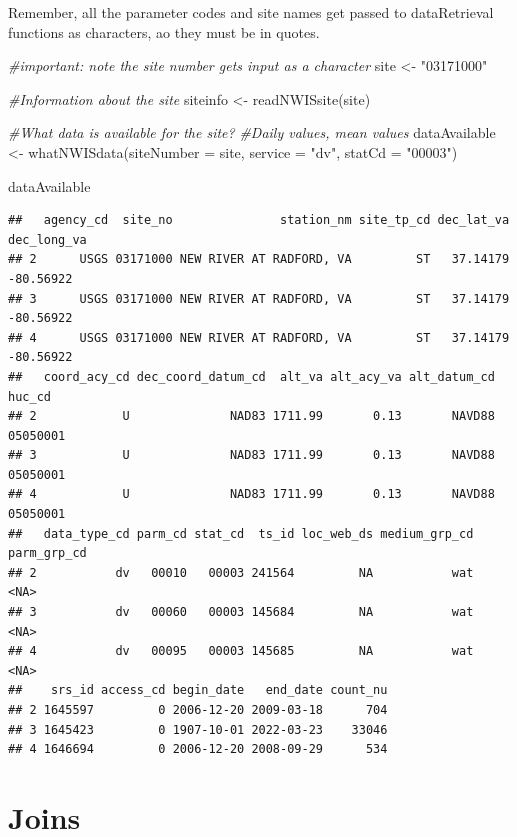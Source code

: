 \documentclass[
]{book}
\newenvironment{Shaded}{\begin{snugshade}}{\end{snugshade}}
\newcommand{\AttributeTok}[1]{\textcolor[rgb]{0.77,0.63,0.00}{#1}}
\newcommand{\CommentTok}[1]{\textcolor[rgb]{0.56,0.35,0.01}{\textit{#1}}}
\newcommand{\FunctionTok}[1]{\textcolor[rgb]{0.00,0.00,0.00}{#1}}
\newcommand{\NormalTok}[1]{#1}
\newcommand{\OtherTok}[1]{\textcolor[rgb]{0.56,0.35,0.01}{#1}}
\newcommand{\StringTok}[1]{\textcolor[rgb]{0.31,0.60,0.02}{#1}}
\begin{document}
Remember, all the parameter codes and site names get passed to dataRetrieval functions as characters, ao they must be in quotes.

\begin{Shaded}
\begin{Highlighting}[]
\CommentTok{\#important: note the site number gets input as a character}
\NormalTok{site }\OtherTok{\textless{}{-}} \StringTok{"03171000"}

\CommentTok{\#Information about the site}
\NormalTok{siteinfo }\OtherTok{\textless{}{-}} \FunctionTok{readNWISsite}\NormalTok{(site)}

\CommentTok{\#What data is available for the site?}
\CommentTok{\#Daily values, mean values}
\NormalTok{dataAvailable }\OtherTok{\textless{}{-}} \FunctionTok{whatNWISdata}\NormalTok{(}\AttributeTok{siteNumber =}\NormalTok{ site, }\AttributeTok{service =} \StringTok{"dv"}\NormalTok{, }\AttributeTok{statCd =} \StringTok{"00003"}\NormalTok{)}

\NormalTok{dataAvailable}
\end{Highlighting}
\end{Shaded}

\begin{verbatim}
##   agency_cd  site_no               station_nm site_tp_cd dec_lat_va dec_long_va
## 2      USGS 03171000 NEW RIVER AT RADFORD, VA         ST   37.14179   -80.56922
## 3      USGS 03171000 NEW RIVER AT RADFORD, VA         ST   37.14179   -80.56922
## 4      USGS 03171000 NEW RIVER AT RADFORD, VA         ST   37.14179   -80.56922
##   coord_acy_cd dec_coord_datum_cd  alt_va alt_acy_va alt_datum_cd   huc_cd
## 2            U              NAD83 1711.99       0.13       NAVD88 05050001
## 3            U              NAD83 1711.99       0.13       NAVD88 05050001
## 4            U              NAD83 1711.99       0.13       NAVD88 05050001
##   data_type_cd parm_cd stat_cd  ts_id loc_web_ds medium_grp_cd parm_grp_cd
## 2           dv   00010   00003 241564         NA           wat        <NA>
## 3           dv   00060   00003 145684         NA           wat        <NA>
## 4           dv   00095   00003 145685         NA           wat        <NA>
##    srs_id access_cd begin_date   end_date count_nu
## 2 1645597         0 2006-12-20 2009-03-18      704
## 3 1645423         0 1907-10-01 2022-03-23    33046
## 4 1646694         0 2006-12-20 2008-09-29      534
\end{verbatim}

\hypertarget{joins}{%
\section{Joins}\label{joins}}
\end{document}
